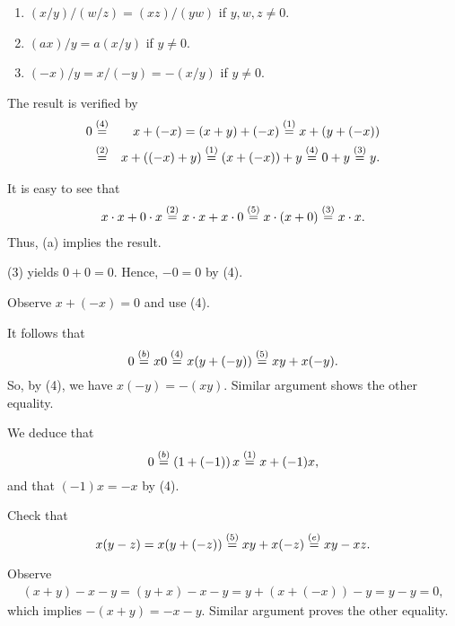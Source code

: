 \documentclass[a4paper,12pt]{article}
\begin{document}
\begin{exe}
\begin{enumerate}
		\item
		      \( (x/y)/(w/z)=(xz)/(yw) \)
		      if
		      \( y,w,z\neq 0 \).
		      
		\item
		      \( (ax)/y=a(x/y) \)
		      if
		      \( y \neq 0 \).
		      
		\item
		      \( (-x)/y=x/(-y)=-(x/y) \)
		      if
		      \( y \neq 0\).
	\end{enumerate}
\end{exe}\begin{sol}\leavevmode \par
	The result is verified by
	\begin{eqnarray*}
		0
		&\stackrel{(4)}{=}&
		x +(-x)
		=
		(x+y)+(-x)
		\stackrel{(1)}{=}
		x+\left( y+(-x) \right)\\
		&\stackrel{(2)}{=}&
		x+\left( (-x)+y \right)
		\stackrel{(1)}{=}
		\left( x+(-x) \right)+y
		\stackrel{(4)}{=}
		0+y
		\stackrel{(3)}{=}
		y.
	\end{eqnarray*}
	
	It is easy to see that
	\begin{eqnarray*}
		x\cdot x+0\cdot x
		\stackrel{(2)}{=}
		x\cdot x+x\cdot 0
		\stackrel{(5)}{=}
		x\cdot(x+0)
		\stackrel{(3)}{=}
		x\cdot x.
	\end{eqnarray*}
	Thus, (a) implies the result.
	
	(3) yields
	\( 0+0=0 \).
	Hence,
	\( -0=0 \)
	by (4).
	
	Observe
	\( x+(-x)=0 \)
	and use (4).
	
	It follows that
	\begin{equation*}
		0
		\stackrel{(b)}{=}
		x 0
		\stackrel{(4)}{=}
		x(y+(-y))
		\stackrel{(5)}{=}
		xy+x(-y).
	\end{equation*}
	So, by (4), we have
	\( x(-y)=-(xy) \).
	Similar argument shows
	the other equality.
	
	We deduce that 
	\begin{equation*}
		0
		\stackrel{(b)}{=}
		\left( 1+(-1) \right)x
		\stackrel{(1)}{=}
		x+(-1)x,
	\end{equation*}
	and that
	\( (-1)x=-x \)
	by (4).
	
	Check that
	\begin{equation*}
		x(y-z)
		=
		x(y+(-z))
		\stackrel{(5)}{=}
		xy+x(-z)
		\stackrel{(e)}{=}
		xy-xz.
	\end{equation*}
	
	Observe
	\begin{eqnarray*}
		(x+y) -x-y
		=
		(y+x)-x-y
		=
		y+(x+(-x))-y
		=
		y-y
		=0,
	\end{eqnarray*}
	which implies
	\( -(x+y)=-x-y \).
	Similar argument proves
	the other equality.
	

\end{sol}
\end{document}
